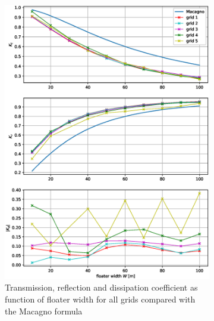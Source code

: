 \begin{figure}[h]
    \centering
    \begin{subfigure}[b]{0.49\textwidth}
        \centering
        \includegraphics[width=\textwidth]{figures/Validation/magagno_with_grid_simulations_eps.eps}
        \caption[]%
        {{\small Transmission, reflection and dissipation coefficient as function of floater width for all grids compared with the Macagno formula}}    
        \label{fig:Macagnocomparison}
    \end{subfigure}
    \hfill
    \begin{subfigure}[b]{0.49\textwidth}  
        \centering 

\end{subfigure}
\end{figure}
